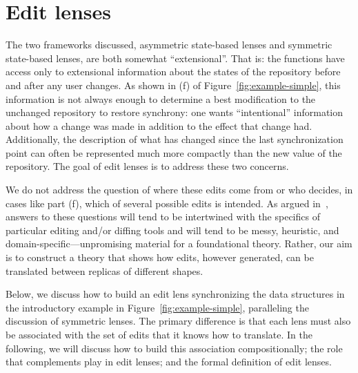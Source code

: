 
\iffull

\section{Edit lenses}
\label{sec:edit_lenses}
The two frameworks discussed, asymmetric state-based lenses and symmetric
state-based lenses, are both somewhat ``extensional''. That is: the
\PUT{} functions have access only to extensional information about the
states of the repository before and after any user changes. As shown in (f)
of Figure~\ref{fig:example-simple}, this information is not always enough to
determine a best modification to the unchanged repository to restore
synchrony: one wants ``intentional'' information about how a change was made
in addition to the effect that change had. Additionally, the description of
what has changed since the last synchronization point can often be
represented much more compactly than the new value of the repository. The
goal of edit lenses is to address these two concerns.

We do not address the question of where these edits come from or who
decides, in cases like part (f), which of several possible edits is
intended.  As argued in~\cite{Matching10}, answers to these questions will
tend to be intertwined with the specifics of particular editing and/or
diffing tools and will tend to be messy, heuristic, and
domain-specific---unpromising material for a foundational theory.  Rather,
our aim is to construct a theory that shows how edits, however
generated, can be translated between replicas of different shapes.

Below, we discuss how to build an edit lens synchronizing the data
structures in the introductory example in Figure~\ref{fig:example-simple},
paralleling the discussion of symmetric lenses. The primary difference is
that each lens must also be associated with the set of edits that it knows
how to translate. In the following, we will discuss how to build this
association compositionally; the role that complements play in edit lenses;
and the formal definition of edit lenses.


